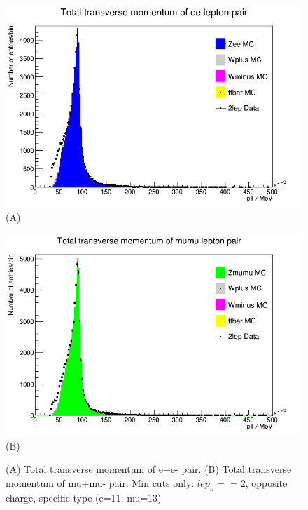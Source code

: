 \begin{figure}[h!]
    \centering
    \begin{minipage}{0.5\textwidth}
        \centering
        \includegraphics[width=\linewidth]{plots/25-02-2021/Zee-Stack_total-pt_(min-cut_2lep=e+e-)_25-02-21_09-50.png}
        (A)
    \end{minipage}\hfill
    \begin{minipage}{0.5\textwidth}
        \centering
        \includegraphics[width=\linewidth]{plots/25-02-2021/Zmumu-Stack_total-pt_(min-cut_2lep=mu+mu-)_25-02-21_09-50.png}
        (B)
    \end{minipage}
    \caption{(A) Total transverse momentum of e+e- pair. (B) Total transverse momentum of mu+mu- pair. Min cuts only: $lep_n==2$, opposite charge, specific type (e=11, mu=13)}
    \label{fig:Zmumu-Stack_total-pt_(min-cut_2lep=ll)_25-02-21}
\end{figure}

